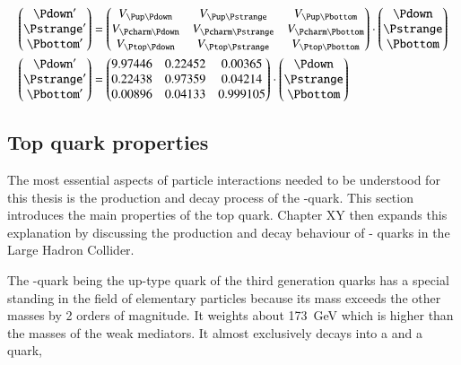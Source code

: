 \begin{align}
\begin{pmatrix}
\Pdown^{\prime} \\
\Pstrange^{\prime} \\
\Pbottom^{\prime}
\end{pmatrix}
&=
\begin{pmatrix}
\Vud & \Vus & \Vub \\
\Vcd & \Vcs & \Vcb \\
\Vtd & \Vts & \Vtb \\
\end{pmatrix}
\cdot
\begin{pmatrix}
\Pdown \\
\Pstrange \\
\Pbottom
\end{pmatrix}\\
%
\begin{pmatrix}
\Pdown^{\prime} \\
\Pstrange^{\prime} \\
\Pbottom^{\prime}
\end{pmatrix}
&=
\begin{pmatrix}
9.97446 & 0.22452 & 0.00365 \\
0.22438 & 0.97359 & 0.04214 \\
0.00896 & 0.04133 & 0.999105 \\
\end{pmatrix}
\cdot
\begin{pmatrix}
\Pdown \\
\Pstrange \\
\Pbottom
\end{pmatrix}
\end{align}

\subsection{Top quark properties}

The most essential aspects of particle interactions needed to be understood for this thesis is the production and decay process of the \Ptop-quark. This section introduces the main properties of the top quark. Chapter XY then expands this explanation by discussing the production and decay behaviour of \Ptop- quarks in the Large Hadron Collider.

The \Ptop-quark being the up-type quark of the third generation quarks has a special standing in the field of elementary particles because its mass exceeds the other masses by \num{2} orders of magnitude. It weights about \SI{173}{\giga \electronvolt} which is higher than the masses of the weak mediators. It almost exclusively decays into a \PW and a \Pbottom quark,


